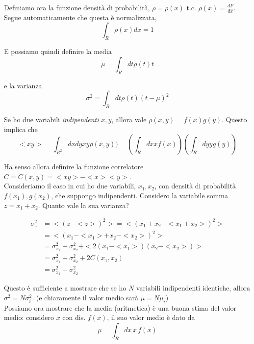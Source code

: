 \documentclass{report}
\begin{document}
Definiamo ora la funzione densità di probabilità, $\rho= \rho(x)$ t.c. $\rho(x) = \frac{dF}{dx}$. Segue automaticamente che questa è normalizzata, 
\begin{equation}
    \int_R\rho(x)dx = 1
\end{equation}

E possiamo quindi definire la media 
\begin{equation}
    \mu = \int_Rdt \rho(t)t
\end{equation}

e la varianza
\begin{equation}
    \sigma^2 = \int_Rdt \rho(t)(t-\mu)^2
\end{equation}

Se ho due variabili \emph{indipendenti} $x,y$, allora vale $\rho(x, y) = f(x)g(y)$. Questo implica che 
\begin{equation}
    <x y> = \int_{R^2}dxdy xy\rho(x, y) ) = \left(\int_R dx xf(x) \right)\left(\int_R dy yg(y) \right)
\end{equation}

Ha senso allora definire la funzione correlatore $C= C(x, y) = <xy> - <x><y>$. \\

Consideriamo il caso in cui ho due variabili, $x_1, x_2$, con densità di probabilità $f(x_1), g(x_2)$, che suppongo indipendenti. Considero la variabile somma $z = x_1 + x_2$. Quanto vale la sua varianza? 

\begin{align}
    \sigma_z^2 &= <(z - <z>)^2>  = <(x_1 + x_2 - <x_1 + x_2>)^2> \\
    &= <(x_1 - <x_1> + x_2 - <x_2>)^2> \\
    &= \sigma_{x_1}^2 + \sigma_{x_2}^2 + <2(x_1 -<x_1>)(x_2 - <x_2>)> \\
    &= \sigma_{x_1}^2 + \sigma_{x_2}^2 + 2C(x_1, x_2) \\
    &= \sigma_{x_1}^2 + \sigma_{x_2}^2
\end{align}

Questo è sufficiente a mostrare che se ho $N$ variabili indipendenti identiche, allora $\sigma^2 = N\sigma^2_i$. (e chiaramente il valor medio sarà $\mu = N\mu_i$)\\

Possiamo ora mostrare che la media (aritmetica) è una buona stima del valor medio:
considero $x$ con dis. $f(x)$, il suo valor medio è dato da
\begin{equation}
    \mu = \int_R dx \, x\, f(x)
\end{equation}
\end{document}
